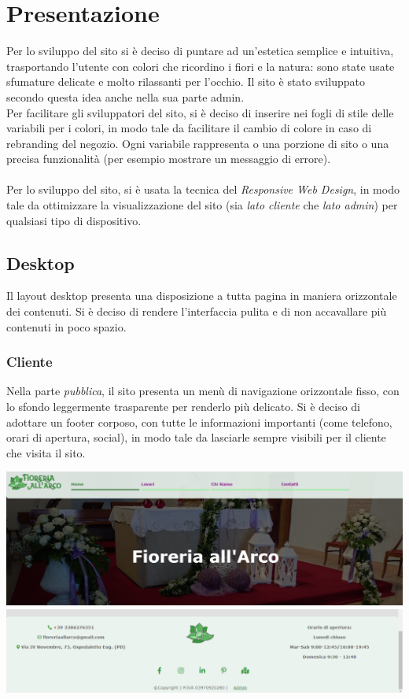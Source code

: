 \section{Presentazione}
Per lo sviluppo del sito si è deciso di puntare ad un'estetica semplice e intuitiva, trasportando l'utente con colori che ricordino i fiori e la natura: sono state usate sfumature delicate e molto rilassanti per l'occhio. Il sito è stato sviluppato secondo questa idea anche nella sua parte admin.\\Per facilitare gli sviluppatori del sito, si è deciso di inserire nei fogli di stile delle variabili per i colori, in modo tale da facilitare il cambio di colore in caso di rebranding del negozio. Ogni variabile rappresenta o una porzione di sito o una precisa funzionalità (per esempio mostrare un messaggio di errore).\\\\Per lo sviluppo del sito, si è usata la tecnica del \textit{Responsive Web Design}, in modo tale da ottimizzare la visualizzazione del sito (sia \textit{lato cliente} che \textit{lato admin}) per qualsiasi tipo di dispositivo.   

\subsection{Desktop}
Il layout desktop presenta una disposizione a tutta pagina in maniera orizzontale dei contenuti. Si è deciso di rendere l'interfaccia pulita e di non accavallare più contenuti in poco spazio. 
\subsubsection{Cliente}
Nella parte \textit{pubblica}, il sito presenta un menù di navigazione orizzontale fisso, con lo sfondo leggermente trasparente per renderlo più delicato.
Si è deciso di adottare un footer corposo, con tutte le informazioni importanti (come telefono, orari di apertura, social), in modo tale da lasciarle sempre visibili per il cliente che visita il sito.
\begin{center}
\includegraphics[scale = 0.35]{../latex/images/desktopclient.png}\\[0.5cm]
\includegraphics[scale = 0.35]{../latex/images/desktopclient-footer.png}\\[0.5cm]
\end{center}
